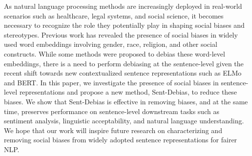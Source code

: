 As natural language processing methods are increasingly deployed in real-world scenarios such as healthcare, legal systems, and social science, it becomes necessary to recognize the role they potentially play in shaping social biases and stereotypes. Previous work has revealed the presence of social biases in widely used word embeddings involving gender, race, religion, and other social constructs. While some methods were proposed to debias these word-level embeddings, there is a need to perform debiasing at the sentence-level given the recent shift towards new contextualized sentence representations such as ELMo and BERT. In this paper, we investigate the presence of social biases in sentence-level representations and propose a new method, Sent-Debias, to reduce these biases. We show that Sent-Debias is effective in removing biases, and at the same time, preserves performance on sentence-level downstream tasks such as sentiment analysis, linguistic acceptability, and natural language understanding. We hope that our work will inspire future research on characterizing and removing social biases from widely adopted sentence representations for fairer NLP.
